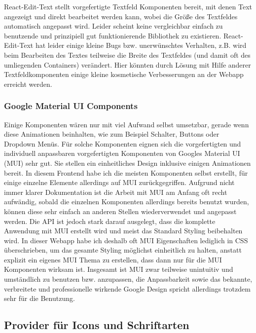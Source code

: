 React-Edit-Text stellt vorgefertigte Textfeld Komponenten bereit, mit denen Text angezeigt und direkt bearbeitet werden kann, wobei die Größe des Textfeldes automatisch angepasst wird. Leider scheint keine vergleichbar einfach zu benutzende und prinzipiell gut funktionierende Bibliothek zu existieren. React-Edit-Text hat leider einige kleine Bugs bzw. unerwünschtes Verhalten, z.B. wird beim Bearbeiten des Textes teilweise die Breite des Textfeldes (und damit oft des umliegenden Containers) verändert. Hier könnten durch Lösung mit Hilfe anderer Textfeldkomponenten einige kleine kosmetische Verbesserungen an der Webapp erreicht werden.

\subsubsection{Google Material UI Components}

Einige Komponenten wären nur mit viel Aufwand selbst umsetzbar, gerade wenn diese Animationen beinhalten, wie zum Beispiel Schalter, Buttons oder Dropdown Menüs. Für solche Komponenten eignen sich die vorgefertigten und individuell anpassbaren vorgefertigten Komponenten von Googles Material UI (MUI) sehr gut. Sie stellen ein einheitliches Design inklusive einigen Animationen bereit. In diesem Frontend habe ich die meisten Komponenten selbst erstellt, für einige einzelne Elemente allerdings auf MUI zurückgegriffen. Aufgrund nicht immer klarer Dokumentation ist die Arbeit mit MUI am Anfang oft recht aufwändig, sobald die einzelnen Komponenten allerdings bereits benutzt wurden, können diese sehr einfach an anderen Stellen wiederverwendet und angepasst werden. Die API ist jedoch stark darauf ausgelegt, dass die komplette Anwendung mit MUI erstellt wird und meist das Standard Styling beibehalten wird. In dieser Webapp habe ich deshalb oft MUI Eigenschaften lediglich in CSS überschrieben, um das gesamte Styling möglichst einheitlich zu halten, anstatt explizit ein eigenes MUI Thema zu erstellen, dass dann nur für die MUI Komponenten wirksam ist. Insgesamt ist MUI zwar teilweise unintuitiv und umständlich zu benutzen bzw. anzupassen, die Anpassbarkeit sowie das bekannte, verbreitete und professionelle wirkende Google Design spricht allerdings trotzdem sehr für die Benutzung. 

\subsection{Provider für Icons und Schriftarten}


